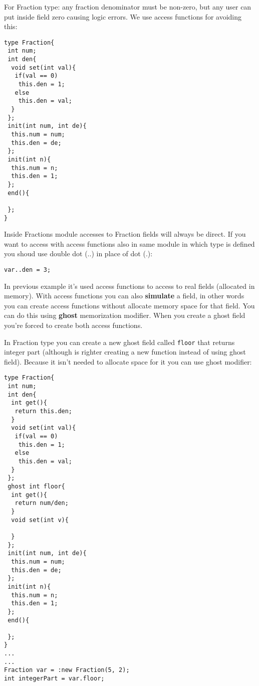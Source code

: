 \documentclass[10pt]{book}%
\newcommand{\code}[1]{\texttt{#1}}
\renewcommand{\emph}[1]{\textbf{#1}}
\newenvironment{codeenv}{
\begin{mdframed}[backgroundcolor=black!20,topline=false,leftline=false,rightline=false,bottomline=false]
}
{\end{mdframed}}
\begin{document}
For Fraction type: any fraction denominator must be non-zero, but any user can put inside field zero causing logic errors. We use access functions for avoiding this:
\begin{codeenv}
\begin{verbatim}
type Fraction{
 int num;
 int den{
  void set(int val){
   if(val == 0)
    this.den = 1;
   else
    this.den = val;
  }
 };
 init(int num, int de){
  this.num = num;
  this.den = de;
 };
 init(int n){
  this.num = n;
  this.den = 1;
 };
 end(){
 
 };
}
\end{verbatim}
\end{codeenv}

Inside Fractions module accesses to Fraction fields will always be direct. If you want to access with access functions also in same module in which type is defined you shoud use double dot (..) in place of dot (.):
\begin{codeenv}
\begin{verbatim}
var..den = 3;
\end{verbatim}
\end{codeenv}

In previous example it's used access functions to access to real fields (allocated in memory). With access functions you can also \emph{simulate} a field, in other words you can create access functions without allocate memory space for that field. You can do this using \emph{ghost} memorization modifier. When you create a ghost field you're forced to create both access functions.

In Fraction type you can create a new ghost field called \code{floor} that returns integer part (although is righter creating a new function instead of using ghost field). Because it isn't needed to allocate space for it you can use ghost modifier:
\begin{codeenv}
\begin{verbatim}
type Fraction{
 int num;
 int den{
  int get(){
   return this.den;
  }
  void set(int val){
   if(val == 0)
    this.den = 1;
   else
    this.den = val;
  }
 };
 ghost int floor{
  int get(){
   return num/den;
  }
  void set(int v){
  
  }
 };
 init(int num, int de){
  this.num = num;
  this.den = de;
 };
 init(int n){
  this.num = n;
  this.den = 1;
 };
 end(){
 
 };
}
...
...
Fraction var = :new Fraction(5, 2);
int integerPart = var.floor;
\end{verbatim}
\end{codeenv}
\end{document}
